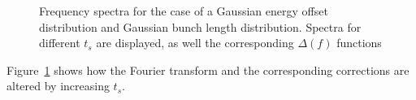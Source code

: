 \begin{figure}[bt]
\centering
{}
\caption{Frequency spectra for the case of a Gaussian energy offset distribution and Gaussian bunch length distribution. Spectra for different $t_s$ are displayed, as well the corresponding $\Delta(f)$ functions}
\label{fig:FT_tspread}
\end{figure}

Figure~\ref{fig:FT_tspread} shows how the Fourier transform and the corresponding corrections are altered by increasing $t_s$.
